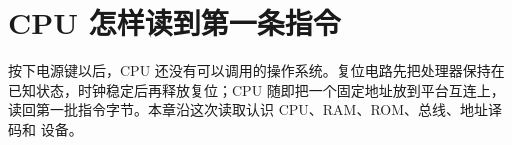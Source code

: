 \chapter{CPU 怎样读到第一条指令}

按下电源键以后，CPU 还没有可以调用的操作系统。复位电路先把处理器保持在
已知状态，时钟稳定后再释放复位；CPU 随即把一个固定地址放到平台互连上，
读回第一批指令字节。本章沿这次读取认识 CPU、RAM、ROM、总线、地址译码和
设备。



